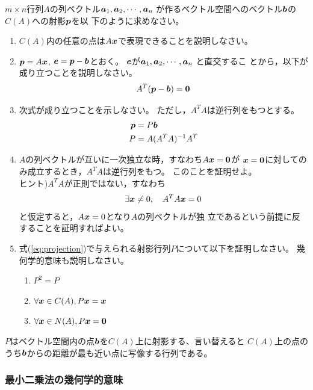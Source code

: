 \documentclass[twocolumn,11pt]{jarticle}
\begin{document}
\nquestion
$m\times n$行列$A$の列ベクトル$\boldsymbol{a}_1,\boldsymbol{a}_2, \cdots, \boldsymbol{a}_n$
が作るベクトル空間へのベクトル$\boldsymbol{b}$の$C(A)$への射影$\boldsymbol{p}$を以
下のように求めなさい。
\begin{enumerate}
\item $C(A)$内の任意の点は$A\boldsymbol{x}$で表現できることを説明しなさい。
\item $\boldsymbol{p}=A\boldsymbol{x}$, $\boldsymbol{e}=\boldsymbol{p}-\boldsymbol{b}$とおく。
  $\boldsymbol{e}$が$\boldsymbol{a}_1,\boldsymbol{a}_2, \cdots, \boldsymbol{a}_n$ と直交するこ
  とから，以下が成り立つことを説明しなさい。
  \begin{align}
    A^T(\boldsymbol{p}-\boldsymbol{b})=\boldsymbol{0}\notag
  \end{align}
\item 次式が成り立つことを示しなさい。
ただし，$A^TA$は逆行列をもつとする。
  \begin{align}
    \boldsymbol{p}&=P\boldsymbol{b}\notag\\
    \label{eq:projection}
    P&=A(A^TA)^{-1}A^T
  \end{align}
\item 
  $A$の列ベクトルが互いに一次独立な時，すなわち$A\boldsymbol{x}=\boldsymbol{0}$が
  $\boldsymbol{x}=\boldsymbol{0}$に対してのみ成立するとき，$A^TA$は逆行列をもつ。
  このことを証明せよ。\\
  ヒント)$A^TA$が正則ではない，すなわち
  \begin{align}
    \exists \boldsymbol{x}\ne 0,\quad  A^TA\boldsymbol{x}=0\notag
  \end{align}
と仮定すると，$A\boldsymbol{x}=0$となり$A$の列ベクトルが独
  立であるという前提に反することを証明すればよい。
\item 式(\ref{eq:projection})で与えられる射影行列$P$について以下を証明しなさい。
  幾何学的意味も説明しなさい。
  \begin{enumerate}
  \item $P^2=P$
  \item $\forall \boldsymbol{x}\in C(A), P\boldsymbol{x}=\boldsymbol{x}$
  \item $\forall \boldsymbol{x}\in N(A), P\boldsymbol{x}=\boldsymbol{0}$
  \end{enumerate}
\end{enumerate}
$P$はベクトル空間内の点$\boldsymbol{b}$を$C(A)$上に射影する、言い替えると
$C(A)$上の点のうち$\boldsymbol{b}$からの距離が最も近い点に写像する行列である。%

\subsubsection{最小二乗法の幾何学的意味\label{sec:single-regression}\prog}
\end{document}
